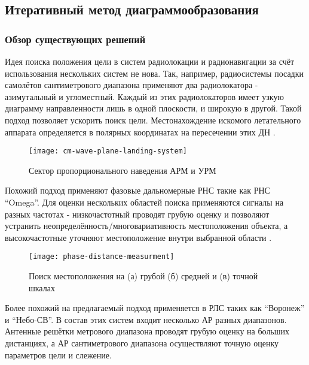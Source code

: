 \subsection{Итеративный метод диаграммообразования}\label{sect:iterative-theory}

\subsubsection{Обзор существующих решений}

Идея поиска положения цели в систем радиолокации и радионавигации за счёт использования нескольких систем не нова. 
Так, например, радиосистемы посадки самолётов сантиметрового диапазона применяют два радиолокатора - азимутальный 
и угломестный. Каждый из этих радиолокаторов имеет узкую диаграмму направленности лишь в одной плоскости, и широкую в 
другой. Такой подход позволяет ускорить поиск цели. Местонахождение искомого летательного аппарата определяется в 
полярных координатах на пересечении этих ДН \cite{BakulevSosnovsky2005}.

\begin{figure}[H]
    \centering
    \texttt{[image: cm-wave-plane-landing-system]}
    \caption{Сектор пропорционального наведения АРМ и УРМ \cite{BakulevSosnovsky2005}}%
    \label{fig:cm-wave-plane-landing-system}
\end{figure}

Похожий подход применяют фазовые дальномерные РНС такие как РНС “Omega”. Для оценки нескольких областей поиска 
применяются сигналы на разных частотах - низкочастотный проводят грубую оценку и позволяют устранить 
неопределённость/многовариативность местоположения объекта, а высокочастотные уточняют местоположение внутри 
выбранной области \cite{BakulevSosnovsky2005}.

\begin{figure}[H]
    \centering
    \texttt{[image: phase-distance-measurment]}
    \caption{Поиск местоположения на (а) грубой (б) средней и (в) точной шкалах \cite{BakulevSosnovsky2005}}%
    \label{fig:phase-distance-measurment}
\end{figure}

Более похожий на предлагаемый подход применяется в РЛС таких как “Воронеж” и “Небо-СВ”. В состав этих систем входит 
несколько АР разных диапазонов. Антенные решётки метрового диапазона проводят грубую оценку на больших дистанциях, 
а АР сантиметрового диапазона осуществляют точную оценку параметров цели и слежение.

